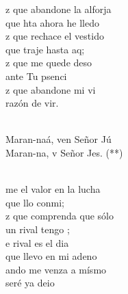 \documentclass[12pt]{article}
\begin{document}
\begin{multicols*}{2}
\begin{cancion}%
	z que abandone la alforja\\
	que hta ahora he lledo\\
	z que rechace el vestido\\
	que traje hasta aq; \\
	z que me quede deso\\
	ante Tu psenci\\
	z que abandone mi vi\\
	razón de vir.\\\jump\\
	\begin{chorus}%
	Maran-naá, ven Señor Jú\\
	Maran-na, v Señor Jes. (**)  \\
	\end{chorus}%
	\jump\\
	me el valor en la lucha\\
	que llo conmi; \\
	z que comprenda que sólo\\
	un rival tengo ;\\
	e rival es el dia\\
	que llevo en mi adeno\\
	ando me venza a mísmo\\
	seré ya deio\\
\end{cancion}%


\end{multicols*}
\end{document}
